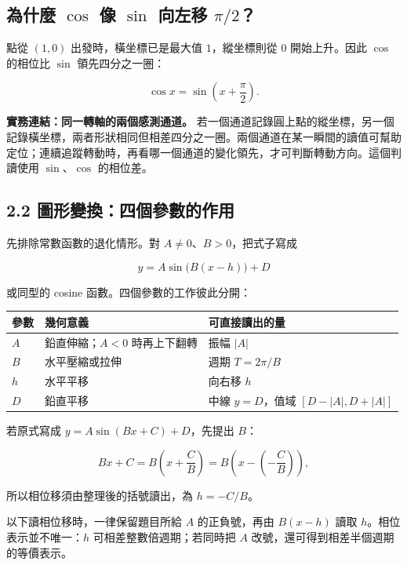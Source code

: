 \documentclass[11pt,a4paper]{article}
\newcounter{none}
\begin{document}
\subsection{\texorpdfstring{為什麼 \(\cos\) 像 \(\sin\) 向左移 \(\pi/2\)？}{為什麼 \textbackslash cos 像 \textbackslash sin 向左移 \textbackslash pi/2？}}\label{ux70baux4ec0ux9ebc-cos-ux50cf-sin-ux5411ux5de6ux79fb-pi2}

點從 \((1,0)\) 出發時，橫坐標已是最大值 \(1\)，縱坐標則從 \(0\) 開始上升。因此 \(\cos\) 的相位比 \(\sin\) 領先四分之一圈：

\[
\boxed{\cos x=\sin\left(x+\frac\pi2\right)}.
\]

\textbf{實務連結：同一轉軸的兩個感測通道。} 若一個通道記錄圓上點的縱坐標，另一個記錄橫坐標，兩者形狀相同但相差四分之一圈。兩個通道在某一瞬間的讀值可幫助定位；連續追蹤轉動時，再看哪一個通道的變化領先，才可判斷轉動方向。這個判讀使用 \(\sin\)、\(\cos\) 的相位差。

\subsection{2.2 圖形變換：四個參數的作用}\label{ux5716ux5f62ux8b8aux63dbux56dbux500bux53c3ux6578ux7684ux4f5cux7528}

先排除常數函數的退化情形。對 \(A\ne0\)、\(B>0\)，把式子寫成

\[
y=A\sin\bigl(B(x-h)\bigr)+D
\]

或同型的 cosine 函數。四個參數的工作彼此分開：

{\def\LTcaptype{none} %
\begin{longtable}[]{@{}lll@{}}
\toprule\noalign{}
參數 & 幾何意義 & 可直接讀出的量 \\
\midrule\noalign{}
\endhead
\bottomrule\noalign{}
\endlastfoot
\(A\) & 鉛直伸縮；\(A<0\) 時再上下翻轉 & 振幅 \(|A|\) \\
\(B\) & 水平壓縮或拉伸 & 週期 \(T=2\pi/B\) \\
\(h\) & 水平平移 & 向右移 \(h\) \\
\(D\) & 鉛直平移 & 中線 \(y=D\)，值域 \([D-|A|,D+|A|]\) \\
\end{longtable}
}

若原式寫成 \(y=A\sin(Bx+C)+D\)，先提出 \(B\)：

\[
Bx+C=B\left(x+\frac{C}{B}\right)
=B\left(x-\left(-\frac CB\right)\right),
\]

所以相位移須由整理後的括號讀出，為 \(h=-C/B\)。

以下讀相位移時，一律保留題目所給 \(A\) 的正負號，再由 \(B(x-h)\) 讀取 \(h\)。相位表示並不唯一：\(h\) 可相差整數倍週期；若同時把 \(A\) 改號，還可得到相差半個週期的等價表示。
\end{document}
